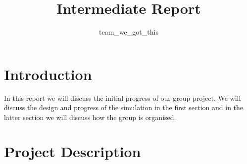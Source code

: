 \documentclass[11pt]{article}
\title{{Intermediate Report}}
\date{}
\author{team\_we\_got\_this}
\begin{document}
	\maketitle
	\thispagestyle{fancy}
	\section{Introduction}
	In this report we will discuss the initial progress of our group project. We will discuss the design and progress of the simulation in the first section and in the latter section we will discuss how the group is organised.
	
	
	\section{Project Description}
	
\end{document}
